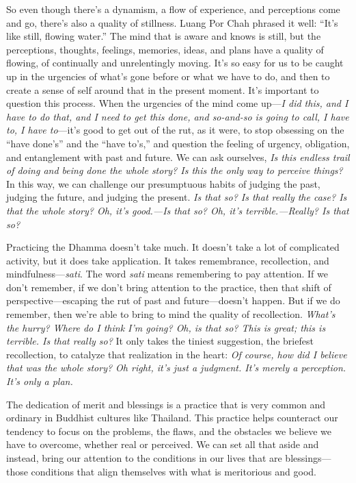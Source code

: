 So even though there's a dynamism, a flow of experience, and 
perceptions come and go, there's also a quality of stillness. Luang Por 
Chah phrased it well: ``It's like still, flowing water.'' The mind that 
is aware and knows is still, but the perceptions, thoughts, feelings, 
memories, ideas, and plans have a quality of flowing, of continually 
and unrelentingly moving. It's so easy for us to be caught up in the 
urgencies of what's gone before or what we have to do, and then to 
create a sense of self around that in the present moment. It's 
important to question this process. When the urgencies of the mind come 
up---\emph{I did this, and I have to do that, and I need to get this 
done, and so-and-so is going to call, I have to, I have to}---it's good 
to get out of the rut, as it were, to stop obsessing on the ``have 
done's'' and the ``have to's,'' and question the feeling of urgency, 
obligation, and entanglement with past and future. We can ask 
ourselves, \emph{Is this endless trail of doing and being done the 
whole story? Is this the only way to perceive things?} In this way, we 
can challenge our presumptuous habits of judging the past, judging the 
future, and judging the present. \emph{Is that so? Is that really the 
case? Is that the whole story? Oh, it's good.---Is that so? Oh, it's 
terrible.---Really? Is that so?}

Practicing the Dhamma doesn't take much. It doesn't take a lot of 
complicated activity, but it does take application. It takes 
remembrance, recollection, and mindfulness---\emph{sati}. The word 
\emph{sati} means remembering to pay attention. If we don't remember, 
if we don't bring attention to the practice, then that shift of 
perspective---escaping the rut of past and future---doesn't happen. But 
if we do remember, then we're able to bring to mind the quality of 
recollection. \emph{What's the hurry? Where do I think I'm going? Oh, 
is that so? This is great; this is terrible. Is that really so?} It 
only takes the tiniest suggestion, the briefest recollection, to 
catalyze that realization in the heart: \emph{Of course, how did I 
believe that was the whole story? Oh right, it's just a judgment. It's 
merely a perception. It's only a plan.}


The dedication of merit and blessings is a practice that is very common 
and ordinary in Buddhist cultures like Thailand. This practice helps 
counteract our tendency to focus on the problems, the flaws, and the 
obstacles we believe we have to overcome, whether real or perceived. We 
can set all that aside and instead, bring our attention to the 
conditions in our lives that are blessings---those conditions that 
align themselves with what is meritorious and good.

